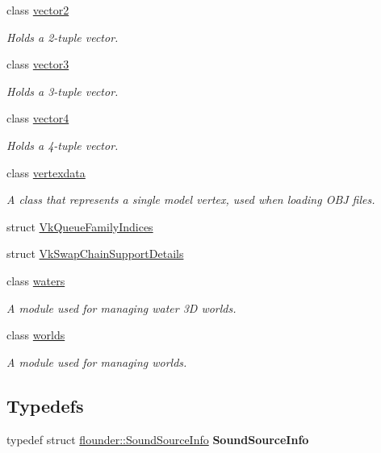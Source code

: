\begin{DoxyCompactItemize}
class \hyperlink{classflounder_1_1vector2}{vector2}
\begin{DoxyCompactList}\small\item\em Holds a 2-\/tuple vector. \end{DoxyCompactList}\item 
class \hyperlink{classflounder_1_1vector3}{vector3}
\begin{DoxyCompactList}\small\item\em Holds a 3-\/tuple vector. \end{DoxyCompactList}\item 
class \hyperlink{classflounder_1_1vector4}{vector4}
\begin{DoxyCompactList}\small\item\em Holds a 4-\/tuple vector. \end{DoxyCompactList}\item 
class \hyperlink{classflounder_1_1vertexdata}{vertexdata}
\begin{DoxyCompactList}\small\item\em A class that represents a single model vertex, used when loading O\+BJ files. \end{DoxyCompactList}\item 
struct \hyperlink{structflounder_1_1_vk_queue_family_indices}{Vk\+Queue\+Family\+Indices}
\item 
struct \hyperlink{structflounder_1_1_vk_swap_chain_support_details}{Vk\+Swap\+Chain\+Support\+Details}
\item 
class \hyperlink{classflounder_1_1waters}{waters}
\begin{DoxyCompactList}\small\item\em A module used for managing water 3D worlds. \end{DoxyCompactList}\item 
class \hyperlink{classflounder_1_1worlds}{worlds}
\begin{DoxyCompactList}\small\item\em A module used for managing worlds. \end{DoxyCompactList}\end{DoxyCompactItemize}
\subsection*{Typedefs}
\begin{DoxyCompactItemize}
\item 
\mbox{\label{namespaceflounder_a54659156f77374273d3416d96a44dea6}} 
typedef struct \hyperlink{structflounder_1_1_sound_source_info}{flounder\+::\+Sound\+Source\+Info} {\bfseries Sound\+Source\+Info}
\end{DoxyCompactItemize}
